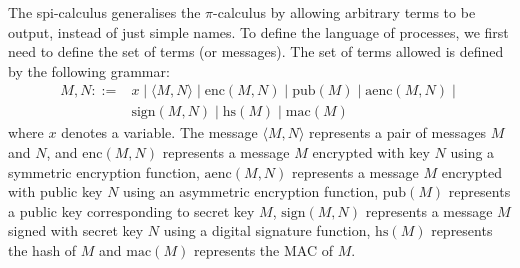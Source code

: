 \documentclass{article}
\begin{document}
The spi-calculus generalises the $\pi$-calculus by allowing arbitrary terms to be output,
instead of just simple names. To define the language of processes, we first need to define
the set of terms (or messages). The set of terms allowed is defined by the following grammar:
$$
\begin{array}{ll}
M, N  ::= & x \mid \langle M, N \rangle \mid \mathrm{enc}(M, N) \mid \mathrm{pub}(M) \mid \mathrm{aenc}(M, N) \mid \\
	  & \mathrm {sign}(M, N) \mid \mathrm{hs}(M) \mid \mathrm{mac}(M)
\end{array}
$$
where $x$ denotes a variable.
The message $\langle M, N \rangle$ represents
a pair of messages $M$ and $N$, and $\mathrm{enc}(M,N)$ represents a message $M$ encrypted
with key $N$ using a symmetric encryption function, $\mathrm{aenc}(M, N)$ represents a message $M$ encrypted with public key $N$
using an asymmetric encryption function, $\mathrm{pub}(M)$ represents a public key corresponding
to secret key $M$, $\mathrm{sign}(M, N)$ represents a message $M$ signed with secret key $N$ using
a digital signature function, $\mathrm{hs}(M)$ represents the hash of $M$ and $\mathrm{mac}(M)$ represents the
MAC of $M$.
\end{document}
